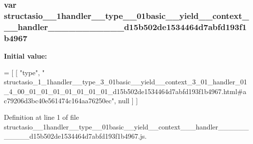 \subsubsection[{structasio\+\_\+1\+\_\+1handler\+\_\+\+\_\+type\+\_\+3\+\_\+01basic\+\_\+\+\_\+yield\+\_\+\+\_\+context\+\_\+3\+\_\+01\+\_\+handler\+\_\+01\+\_\+4\+\_\+00\+\_\+01\+\_\+01\+\_\+01\+\_\+01\+\_\+01\+\_\+01\+\_\+01\+\_\+d15b502de1534464d7abfd193f1b4967}]{\setlength{\rightskip}{0pt plus 5cm}var structasio\+\_\+\_\+1handler\+\_\+\+\_\+type\+\_\+\_\+01basic\+\_\+\+\_\+yield\+\_\+\+\_\+context\+\_\+\_\+\_\+handler\+\_\+\_\+\_\+\_\+\_\+\_\+\_\+\_\+\_\+\_\+\_\+d15b502de1534464d7abfd193f1b4967}\label{structasio__1__1handler____type__3__01basic____yield____context__3__01__handler__01__4__00__01__389abd537c4f15e40a294a56dc5d6a7f_a238951537a366477e22712b1552559b2}
{\bfseries Initial value\+:}
\begin{DoxyCode}
=
[
    [ \textcolor{stringliteral}{"type"}, \textcolor{stringliteral}{"
      structasio\_1\_1handler\_\_type\_3\_01basic\_\_yield\_\_context\_3\_01\_handler\_01\_4\_00\_01\_01\_01\_01\_01\_01\_01\_d15b502de1534464d7abfd193f1b4967.html#ac79206d3bc40e561474c164aa76250ec"}, null ]
]
\end{DoxyCode}


Definition at line 1 of file structasio\+\_\+\_\+1handler\+\_\+\+\_\+type\+\_\+\_\+01basic\+\_\+\+\_\+yield\+\_\+\+\_\+context\+\_\+\_\+\_\+handler\+\_\+\_\+\_\+\_\+\_\+\_\+\_\+\_\+\_\+\_\+\_\+d15b502de1534464d7abfd193f1b4967.\+js.

